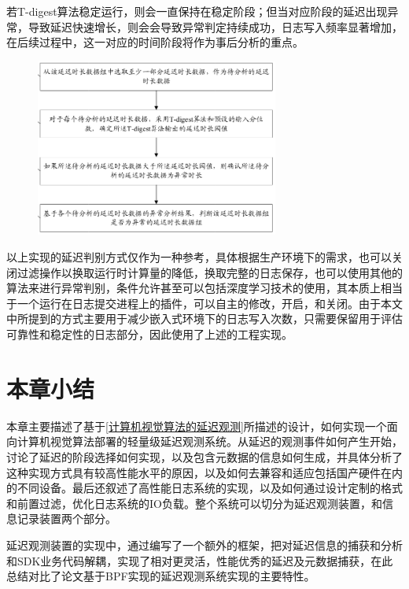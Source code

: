 \documentclass[master,anonymous]{shtthesis}
\begin{document}
若T-digest算法稳定运行，则会一直保持在稳定阶段；但当对应阶段的延迟出现异常，导致延迟快速增长，则会会导致异常判定持续成功，日志写入频率显著增加，在后续过程中，这一对应的时间阶段将作为事后分析的重点。
\begin{figure}[htbp]
	\centering
	\includegraphics[width=8cm]{img/z2.png}
	\label{延迟前置过滤}
\end{figure}

以上实现的延迟判别方式仅作为一种参考，具体根据生产环境下的需求，也可以关闭过滤操作以换取运行时计算量的降低，换取完整的日志保存，也可以使用其他的算法来进行异常判别，条件允许甚至可以包括深度学习技术的使用，其本质上相当于一个运行在日志提交进程上的插件，可以自主的修改，开启，和关闭。由于本文中所提到的方式主要用于减少嵌入式环境下的日志写入次数，只需要保留用于评估可靠性和稳定性的日志部分，因此使用了上述的工程实现。

\section{本章小结}
本章主要描述了基于\ref{计算机视觉算法的延迟观测}所描述的设计，如何实现一个面向计算机视觉算法部署的轻量级延迟观测系统。从延迟的观测事件如何产生开始，讨论了延迟的阶段选择如何实现，以及包含元数据的信息如何生成，并具体分析了这种实现方式具有较高性能水平的原因，以及如何去兼容和适应包括国产硬件在内的不同设备。最后还叙述了高性能日志系统的实现，以及如何通过设计定制的格式和前置过滤，优化日志系统的IO负载。整个系统可以切分为延迟观测装置，和信息记录装置两个部分。

延迟观测装置的实现中，通过编写了一个额外的框架，把对延迟信息的捕获和分析和SDK业务代码解耦，实现了相对更灵活，性能优秀的延迟及元数据捕获，在此总结对比了论文基于BPF实现的延迟观测系统实现的主要特性。
\end{document}
